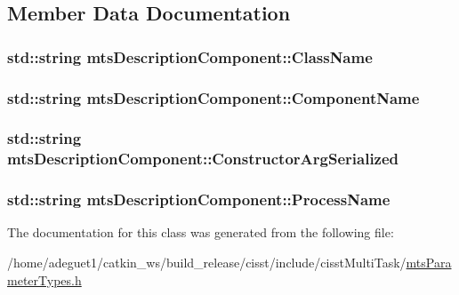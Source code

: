\subsection{Member Data Documentation}
\hypertarget{classmts_description_component_a38a518bbf9ec10334313b6d558c7c774}{
\subsubsection[{Class\-Name}]{\setlength{\rightskip}{0pt plus 5cm}std\-::string mts\-Description\-Component\-::\-Class\-Name}}\label{classmts_description_component_a38a518bbf9ec10334313b6d558c7c774}
\hypertarget{classmts_description_component_ad8aaca842f71e592a1bd50c483cc1bad}{
\subsubsection[{Component\-Name}]{\setlength{\rightskip}{0pt plus 5cm}std\-::string mts\-Description\-Component\-::\-Component\-Name}}\label{classmts_description_component_ad8aaca842f71e592a1bd50c483cc1bad}
\hypertarget{classmts_description_component_a16a127a39f87ca4c87c1cd34b6393f6b}{
\subsubsection[{Constructor\-Arg\-Serialized}]{\setlength{\rightskip}{0pt plus 5cm}std\-::string mts\-Description\-Component\-::\-Constructor\-Arg\-Serialized}}\label{classmts_description_component_a16a127a39f87ca4c87c1cd34b6393f6b}
\hypertarget{classmts_description_component_a84c50616e9ae8b624261a21399d91395}{
\subsubsection[{Process\-Name}]{\setlength{\rightskip}{0pt plus 5cm}std\-::string mts\-Description\-Component\-::\-Process\-Name}}\label{classmts_description_component_a84c50616e9ae8b624261a21399d91395}


The documentation for this class was generated from the following file\-:\begin{DoxyCompactItemize}
\item 
/home/adeguet1/catkin\-\_\-ws/build\-\_\-release/cisst/include/cisst\-Multi\-Task/\hyperlink{mts_parameter_types_8h}{mts\-Parameter\-Types.\-h}\end{DoxyCompactItemize}
